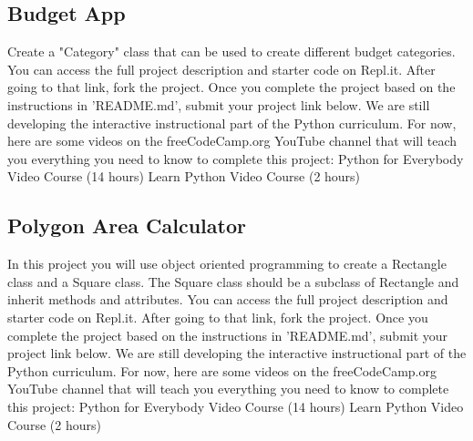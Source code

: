 \documentclass{article}%
\begin{document}
%
\subsection{Budget App}%
\label{subsec:BudgetApp}%
Create a "Category" class that can be used to create different budget categories.\newline%
You can access the full project description and starter code on Repl.it.\newline%
After going to that link, fork the project. Once you complete the project based on the instructions in 'README.md', submit your project link below.\newline%
We are still developing the interactive instructional part of the Python curriculum. For now, here are some videos on the freeCodeCamp.org YouTube channel that will teach you everything you need to know to complete this project:\newline%
Python for Everybody Video Course (14 hours)\newline%
  \newline%
Learn Python Video Course (2 hours)\newline%
  \newline%

%
\subsection{Polygon Area Calculator}%
\label{subsec:PolygonAreaCalculator}%
In this project you will use object oriented programming to create a Rectangle class and a Square class. The Square class should be a subclass of Rectangle and inherit methods and attributes.\newline%
You can access the full project description and starter code on Repl.it.\newline%
After going to that link, fork the project. Once you complete the project based on the instructions in 'README.md', submit your project link below.\newline%
We are still developing the interactive instructional part of the Python curriculum. For now, here are some videos on the freeCodeCamp.org YouTube channel that will teach you everything you need to know to complete this project:\newline%
Python for Everybody Video Course (14 hours)\newline%
  \newline%
Learn Python Video Course (2 hours)\newline%
  \newline%
\end{document}
